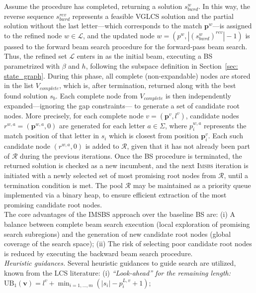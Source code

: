 \documentclass[runningheads]{llncs}
\begin{document}
	Assume the procedure has completed, returning a solution $s^w_{bwrd}$. In this way, the reverse sequence $s_{bwrd}^{rev}$  represents a feasible VGLCS solution and the partial solution without the last letter---which corresponds to the match $\textbf{p}^w$---is assigned to the refined node $ w \in \mathcal{L}$, and the updated node $w=(p^w, |(s^w_{bwrd})^{rev}|-1)$ is passed to the forward beam search procedure for the forward-pass beam search. Thus, the refined set $\mathcal{L}$ enters in as the initial beam, executing a BS parametrized with $\beta$ and $h$, following the subspace definition in Section~\ref{sec: state_graph}.  During this phase, all complete (non-expandable) nodes are stored in the list $V_{complete}$, which is, after termination,  returned along with the best found solution $s_{b}$. %
	Each complete node from $V_{complete}$  is then independently expanded---ignoring the gap constraints--- to generate a set of candidate root nodes. More precisely, for each complete node $v =(\mathbf{p}^v, l^v)$, 
	candidate nodes  $r^{w, a} = (\mathbf{p}^{w, a}, 0)$ are generated for each letter $a \in \Sigma$, where $p^{w, a}_i$ represents the match position of that letter in $s_i$ which is closest from position $\textbf{p}^v_i$. Each such candidate node $(r^{w, a}, 0)$ is added to $\mathcal{R}$, given that it has not already been part of $\mathcal{R}$ during the previous iterations.  Once the BS procedure is terminated, the returned solution is checked as a new incumbent, and  the next \textsc{Imsbs} iteration is initiated with a newly selected set of most promising root nodes from $\mathcal{R}$, until a termination condition is met. The pool $\mathcal{R}$ may be maintained as a priority queue implemented via a binary heap, to ensure efficient extraction of the most promising candidate root nodes. \\
	The core advantages of the IMSBS approach over the baseline BS are: (i)  A balance between complete beam search execution (local exploration of promising search subregions) and the generation of new candidate root nodes (global coverage of the search space); (ii) The risk of selecting poor candidate root nodes is reduced by executing the backward beam search procedure.\\
	\textit{Heuristic guidances.} Several heuristic guidances to guide search are utilized,  known from the LCS literature: (i)  \textit{``Look-ahead'' for the remaining length:} $\textrm{UB}_1(\mathbf{v}) = l^v + \min_{i = 1, \ldots, m} \left( |s_i| - p_i^{L, v} + 1 \right)$;
\end{document}
